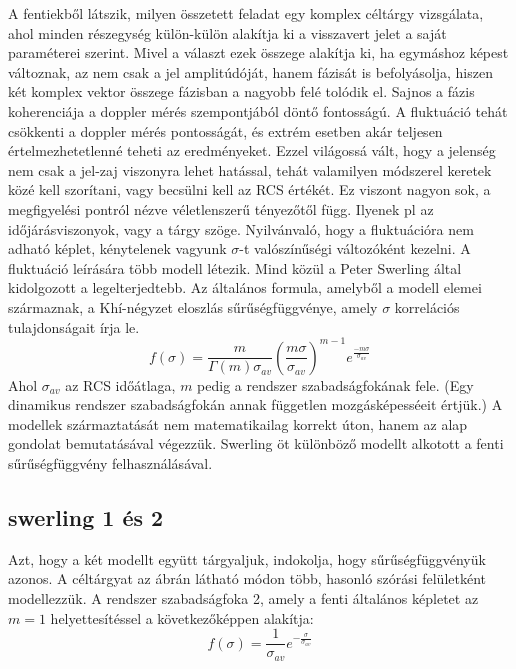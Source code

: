 \documentclass{article}
\begin{document}
A fentiekből látszik, milyen összetett feladat egy komplex céltárgy vizsgálata, ahol minden részegység külön-külön
alakítja ki a visszavert jelet a saját paraméterei szerint. Mivel a választ ezek összege alakítja ki, ha egymáshoz
képest változnak, az nem csak a jel amplitúdóját, hanem fázisát is befolyásolja, hiszen két komplex vektor összege
fázisban a nagyobb felé tolódik el. Sajnos a fázis koherenciája a doppler mérés szempontjából döntő fontosságú.
A fluktuáció tehát csökkenti a doppler mérés pontosságát, és extrém esetben akár teljesen értelmezhetetlenné teheti az eredményeket.
Ezzel világossá vált, hogy a jelenség nem csak a jel-zaj viszonyra lehet hatással, tehát valamilyen módszerel
keretek közé kell szorítani, vagy becsülni kell az RCS értékét.
Ez viszont nagyon sok, a megfigyelési pontról nézve véletlenszerű tényezőtől függ. Ilyenek pl az időjárásviszonyok,
vagy a tárgy szöge. Nyilvánvaló, hogy a fluktuációra nem adható képlet, kénytelenek vagyunk $\sigma$-t valószínűségi
változóként kezelni.
A fluktuáció leírására több modell létezik. Mind közül a Peter Swerling által kidolgozott a legelterjedtebb.
Az általános formula, amelyből a modell elemei származnak, a Khí-négyzet eloszlás sűrűségfüggvénye, amely $\sigma$ korrelációs
tulajdonságait írja le.
    \begin{equation}
        f(\sigma)= \frac{m}{\Gamma(m) \sigma_{av}} \left( \frac{m \sigma}{\sigma_{av}} \right) ^{m-1}
        e^{\frac{-m \sigma}{\sigma_{av}}}
    \end{equation}
Ahol $\sigma_{av}$ az RCS időátlaga, $m$ pedig a rendszer szabadságfokának fele. (Egy dinamikus rendszer szabadságfokán annak
független mozgásképesséeit értjük.) 
A modellek származtatását nem matematikailag korrekt úton, hanem az alap gondolat bemutatásával végezzük.
Swerling öt különböző modellt alkotott a fenti sűrűségfüggvény felhasználásával.

\subsection{swerling 1 és 2}
    Azt, hogy a két modellt együtt tárgyaljuk, indokolja, hogy sűrűségfüggvényük azonos. A céltárgyat az ábrán látható
    módon több, hasonló szórási felületként modellezzük. A rendszer szabadságfoka 2, amely a fenti általános képletet az
    $m=1$ helyettesítéssel a következőképpen alakítja:
    \begin{equation}
        f(\sigma)= \frac{1}{\sigma_{av}} e^{- \frac{\sigma}{\sigma_{av}}}
    \end{equation}
\end{document}
